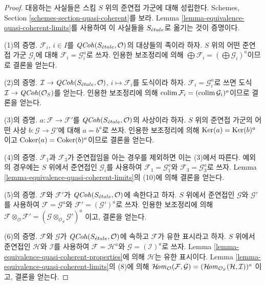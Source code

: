 \begin{proof}
대응하는 사실들은 스킴 $S$ 위의 준연접 가군에 대해 성립한다. Schemes,
Section \ref{schemes-section-quasi-coherent}를 보라. Lemma
\ref{lemma-equivalence-quasi-coherent-limits}를 사용하여 이 사실들을
$S_{\acute{e}tale}$로 옮기는 것이 증명이다.

\medskip\noindent
(1)의 증명. $\mathcal{F}_i$, $i \in I$를
$\mathit{QCoh}(S_{\acute{e}tale}, \mathcal{O})$의 대상들의 족이라 하자.
$S$ 위의 어떤 준연접 가군 $\mathcal{G}_i$에 대해
$\mathcal{F}_i = \mathcal{G}_i^a$로 쓰자. 인용한 보조정리에 의해
$\bigoplus \mathcal{F}_i = (\bigoplus \mathcal{G}_i)^a$이므로 결론을 얻는다.

\medskip\noindent
(2)의 증명. $\mathcal{I} \to \mathit{QCoh}(S_{\acute{e}tale}, \mathcal{O})$,
$i \mapsto \mathcal{F}_i$를 도식이라 하자.
$\mathcal{F}_i = \mathcal{G}_i^a$로 쓰면 도식
$\mathcal{I} \to \mathit{QCoh}(\mathcal{O}_S)$를 얻는다. 인용한 보조정리에 의해
$\mathop{\mathrm{colim}}\nolimits \mathcal{F}_i = (\mathop{\mathrm{colim}}\nolimits \mathcal{G}_i)^a$이므로 결론을 얻는다.

\medskip\noindent
(3)의 증명. $a : \mathcal{F} \to \mathcal{F}'$를
$\mathit{QCoh}(S_{\acute{e}tale}, \mathcal{O})$의 사상이라 하자. $S$ 위의 준연접 가군의
어떤 사상 $b : \mathcal{G} \to \mathcal{G}'$에 대해 $a = b^a$로 쓰자.
인용한 보조정리에 의해 $\mathop{\mathrm{Ker}}(a) = \mathop{\mathrm{Ker}}(b)^a$이고
$\mathop{\mathrm{Coker}}(a) = \mathop{\mathrm{Coker}}(b)^a$이므로 결론을 얻는다.

\medskip\noindent
(4)의 증명. $\mathcal{F}_1$과 $\mathcal{F}_3$가 준연접임을 아는 경우를
제외하면 이는 (3)에서 따른다. 예외의 경우에는 $S$ 위에서 준연접인
$\mathcal{G}_i$를 사용하여 $\mathcal{F}_1 = \mathcal{G}_1^a$와
$\mathcal{F}_3 = \mathcal{G}_3^a$로 쓰자. Lemma
\ref{lemma-equivalence-quasi-coherent-limits}의 (10)에 의해 결론을 얻는다.

\medskip\noindent
(5)의 증명. $\mathcal{F}$와 $\mathcal{F}'$가
$\mathit{QCoh}(S_{\acute{e}tale}, \mathcal{O})$에 속한다고 하자. $S$ 위에서 준연접인
$\mathcal{G}$와 $\mathcal{G}'$를 사용하여
$\mathcal{F} = \mathcal{G}^a$와
$\mathcal{F}' = (\mathcal{G}')^a$로 쓰자. 인용한 보조정리에 의해
$\mathcal{F} \otimes_\mathcal{O} \mathcal{F}' =
(\mathcal{G} \otimes_{\mathcal{O}_S} \mathcal{G}')^a$
이고, 결론을 얻는다.

\medskip\noindent
(6)의 증명. $\mathcal{F}$와 $\mathcal{G}$가
$\mathit{QCoh}(S_{\acute{e}tale}, \mathcal{O})$에 속하고 $\mathcal{F}$가 유한 표시라고
하자. $S$ 위에서 준연접인 $\mathcal{H}$와 $\mathcal{I}$를 사용하여
$\mathcal{F} = \mathcal{H}^a$와 $\mathcal{G} = (\mathcal{I})^a$로 쓰자.
Lemma \ref{lemma-equivalence-quasi-coherent-properties}에 의해
$\mathcal{H}$는 유한 표시이다. Lemma
\ref{lemma-equivalence-quasi-coherent-limits}의 (8)에 의해
$\mathop{\mathcal{H}\!\mathit{om}}\nolimits_\mathcal{O}(\mathcal{F}, \mathcal{G}) =
(\mathop{\mathcal{H}\!\mathit{om}}\nolimits_{\mathcal{O}_S}(\mathcal{H}, \mathcal{I}))^a$
이고, 결론을 얻는다.
\end{proof}

